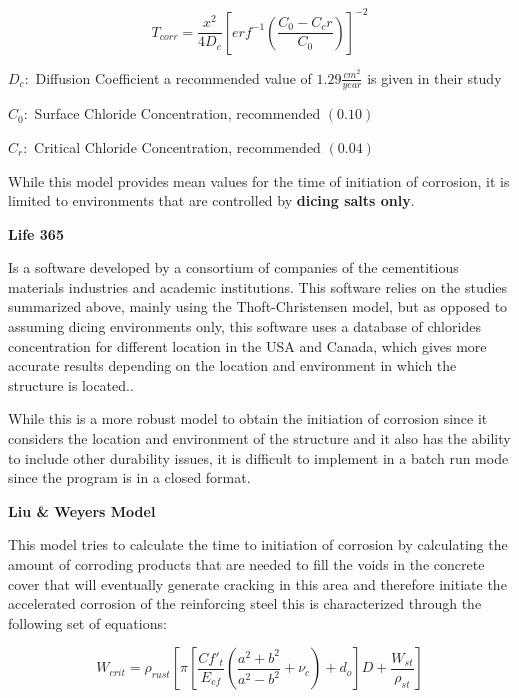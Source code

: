 \begin{equation}
T_{corr}=\frac{x^2}{4 D_c} \left[erf^{-1} \left(\frac{C_0-C_cr}{C_0} \right) \right]^{-2}
  \label{eq.three}
\end{equation} 

$D_c: $ Diffusion Coefficient a recommended value of $1.29 \frac{cm^2}{year}$ is given in their study \citep{Ghosh2010}

$C_0:$ Surface Chloride Concentration, recommended $(0.10)$
 
$C_r:$ Critical Chloride Concentration, recommended $(0.04)$
\newline

While this model provides mean values for the time of initiation of corrosion, it is limited to environments that are controlled by \textbf{dicing salts only}.
\newline

\textbf{Life 365}
\newline

Is a software developed by a consortium of companies of the cementitious materials industries and academic institutions. This software relies on the studies summarized above, mainly using the Thoft-Christensen model, but as opposed to assuming dicing environments only, this software uses a database of chlorides concentration for different location in the USA and Canada, which gives more accurate results depending on the location and environment in which the structure is located..

While this is a more robust model to obtain the initiation of corrosion since it considers the location and environment of the structure and it also has the ability to include other durability issues, it is difficult to implement in a batch run mode since the program is in a closed format.
\newline

\textbf{Liu \& Weyers Model}
\newline

This model tries to calculate the time to initiation of corrosion by calculating the amount of corroding products that are needed to fill the voids in the concrete cover that will eventually generate cracking in this area and therefore initiate the accelerated corrosion of the reinforcing steel this is characterized through the following set of equations:


\begin{equation}
  W_{crit}=\rho_{rust} \left[ \pi \left[ \frac{C f'_t}{E_{ef}} \left( \frac{a^2+b^2}{a^2-b^2}+\nu_c \right)+d_o \right] D+ \frac{W_{st}}{\rho_{st}} \right]
  \label{eq.four}
\end{equation} 


